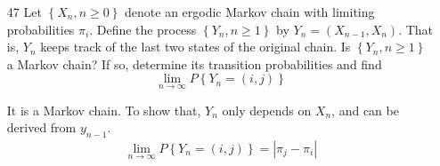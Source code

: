 \documentclass[en,hazy,blue,12pt,device = normal]{elegantnote}
\begin{document}
\begin{enumerate}
    \item[47] Let \(\left\{ X_n,n\geq 0  \right\}\) denote an ergodic Markov chain with limiting probabilities \(\pi_i \). Define the process \(\left\{ Y_n,n\geq 1 \right\}\) by \(Y_n = (X_{n-1},X_n)\). That is, \(Y_n\) keeps track of the last two states of the original chain. Is \(\left\{ Y_n,n\geq 1 \right\}\) a Markov chain? If so, determine its transition probabilities and find 
    \[\lim_{n\to \infty}P\left\{ Y_n = (i,j ) \right\}\]
    \begin{tcolorbox}
        \sol

        It is a Markov chain. To show that, \(Y_n\) only depends on \(X_n\), and can be derived from \(y_{n-1}\).
        \begin{align*}
            \lim_{n\to \infty}P\left\{ Y_n = (i,j ) \right\} = |\pi_j - \pi_i|
        \end{align*}

    \end{tcolorbox}
\end{enumerate}
\end{document}
